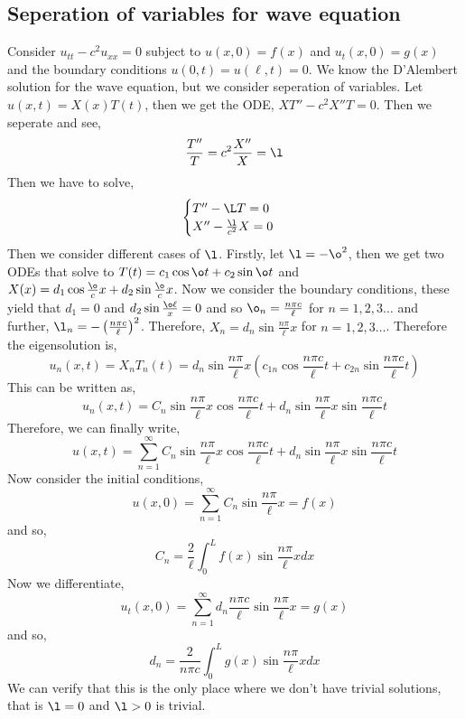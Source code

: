 
\subsection{Seperation of variables for wave equation}
Consider $u_{tt} - c^2u_{xx} = 0$ subject to $u(x, 0) = f(x)$ and $u_t(x, 0) = g(x)$ and the boundary conditions $u(0, t) = u(\ell, t) = 0$. We know the D'Alembert solution for the wave equation, but we consider seperation of variables. Let $u(x, t) = X(x)T(t)$, then we get the ODE, $XT'' -c^2X''T = 0$. Then we seperate and see,
$$ \frac{T''}{T} = c^2 \frac{X''}{X} = \l $$
Then we have to solve,
$$ \begin{cases}
  T'' - \L T = 0\\
  X'' - \frac{\l}{c^2}X = 0
\end{cases} $$
Then we consider different cases of $\l$. Firstly, let $\l = - \o^2$, then we get two ODEs that solve to $T(t) = c_1\cos \o t + c_2\sin \o t$ and $X(x) = d_1\cos \frac{\o}{c}x + d_2\sin \frac{\o}{c}x$. Now we consider the boundary conditions, these yield that $d_1 = 0$ and $d_2\sin \frac{\o \ell}{x} = 0$ and so $\o_n = \frac{n\pi c}{\ell}$ for $n = 1, 2, 3 \dots$
and further, $\l_n = - \left(\frac{n\pi c}{\ell}\right)^2$. Therefore, $X_n = d_n \sin \frac{n\pi}{\ell}x$ for $n = 1, 2,3\dots$. Therefore the eigensolution is,
$$ u_n(x, t) = X_n T_n (t) = d_n\sin \frac{n\pi}{\ell}x \left( c_{1n}\cos \frac{n\pi c}{\ell} t + c_{2n}\sin \frac{n\pi c}{\ell} t \right) $$
This can be written as,
$$ u_n(x, t) = C_n \sin \frac{n\pi }{\ell}x \cos \frac{n\pi c}{\ell} t + d_n \sin \frac{n\pi }{\ell} x \sin \frac{n\pi c}{\ell}t $$
Therefore, we can finally write,
$$ u(x, t) = \sum_{n=1}^\infty C_n \sin \frac{n\pi }{\ell}x \cos \frac{n\pi c}{\ell} t + d_n \sin \frac{n\pi }{\ell} x \sin \frac{n\pi c}{\ell}t $$
Now consider the initial conditions,
$$ u(x, 0) = \sum_{n=1}^\infty C_n \sin \frac{n\pi }{\ell}x = f(x) $$
and so,
$$ C_n = \frac{2}{\ell}\int_0^L f(x)\sin \frac{n\pi}{\ell}x dx $$
Now we differentiate,
$$ u_t(x, 0) = \sum_{n=1}^\infty d_n \frac{n\pi c}{\ell} \sin \frac{n\pi }{\ell} x = g(x) $$
and so,
$$ d_n = \frac{2}{n\pi c}\int_0^L g(x)\sin \frac{n\pi }{\ell}x dx $$
We can verify that this is the only place where we don't have trivial solutions, that is $\l = 0$ and $\l > 0$ is trivial.

